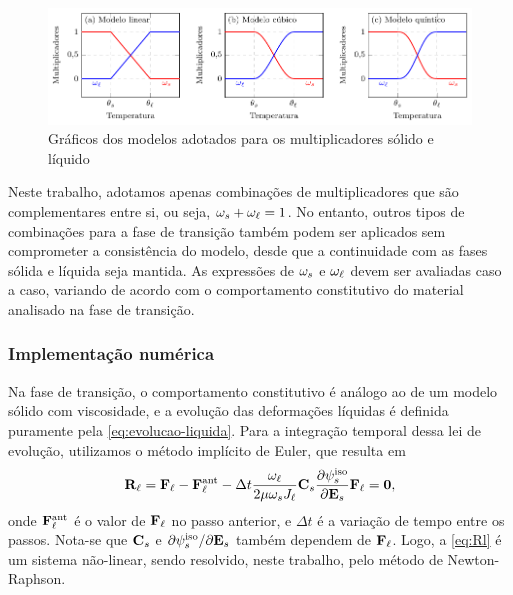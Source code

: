 \documentclass[Tese.tex]{subfiles}
\begin{document}
\begin{figure}[!htb]
	\centering
	\caption{Gráficos dos modelos adotados para os multiplicadores sólido e líquido}
	\label{fig:PhaseChangeMultipliers}
	\includegraphics[width=\textwidth]{Figuras/PhaseChangeMultipliers.pdf}
\end{figure}

Neste trabalho, adotamos apenas combinações de multiplicadores que são complementares entre si, ou seja, $\omega_s + \omega_\ell = 1$. No entanto, outros tipos de combinações para a fase de transição também podem ser aplicados sem comprometer a consistência do modelo, desde que a continuidade com as fases sólida e líquida seja mantida. As expressões de $\omega_s$ e $\omega_\ell$ devem ser avaliadas caso a caso, variando de acordo com o comportamento constitutivo do material analisado na fase de transição.

\vfill

\subsubsection{Implementação numérica}

Na fase de transição, o comportamento constitutivo é análogo ao de um modelo sólido com viscosidade, e a evolução das deformações líquidas é definida puramente pela \cref{eq:evolucao-liquida}. Para a integração temporal dessa lei de evolução, utilizamos o método implícito de Euler, que resulta em
\begin{equation}\label{eq:Rl}
\mathbf{R}_\ell = \mathbf{F}_\ell - \mathbf{F}_\ell^\text{ant} - \Delta t\dfrac{\omega_\ell}{2\mu\omega_sJ_\ell}\mathbf{C}_s\dfrac{\partial\psi_s^\text{iso}}{\partial\mathbf{E}_s}\mathbf{F}_\ell = \mathbf{0},
\end{equation}
onde $\mathbf{F}_\ell^\text{ant}$ é o valor de $\mathbf{F}_\ell$ no passo anterior, e $\Delta t$ é a variação de tempo entre os passos. Nota-se que $\mathbf{C}_s$ e ${\partial\psi_s^\text{iso}}/{\partial\mathbf{E}_s}$ também dependem de $\mathbf{F}_\ell$. Logo, a \cref{eq:Rl} é um sistema não-linear, sendo resolvido, neste trabalho, pelo método de Newton-Raphson.
\end{document}
